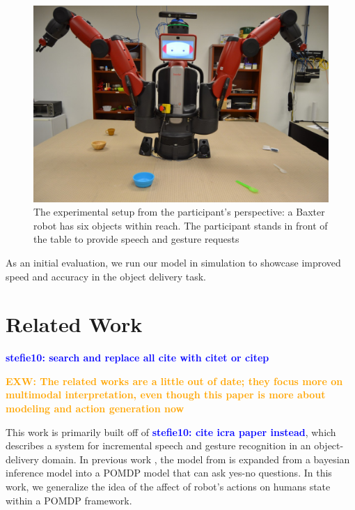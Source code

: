 \documentclass[conference]{IEEEtran}
\newcommand{\exwnote}[1]{\textcolor{orange}{\textbf{EXW: #1}}}
\newcommand{\stnote}[1]{\textcolor{blue}{\textbf{stefie10: #1}}}
\begin{document}
\begin{figure}[t]
	\begin{center}
		\includegraphics[scale=0.17]{resources/firstPerson}
		\caption{The experimental setup from the participant's perspective: a Baxter robot has six objects within reach. The participant stands in front of the table to provide speech and gesture requests}
	\end{center}
\end{figure}



As an initial evaluation, we run our model in simulation to showcase improved speed and accuracy in the object delivery task. 


\section{Related Work}

\stnote{search and replace all cite with  citet or citep}

\exwnote{The related works are a little out of date; they focus more on multimodal interpretation, even though this paper is more about modeling and action generation now}

This work is primarily built off of \citet{eldon15thesis}\stnote{cite icra paper instead}, which describes a system for incremental speech and gesture recognition in an object-delivery domain. In previous work \citep{socialfeedback}, the model from \cite{eldon15thesis} is expanded from a bayesian inference model into a POMDP model that can ask yes-no questions. In this work, we generalize the idea of the affect of robot's actions on humans state within a POMDP framework. 
\end{document}
